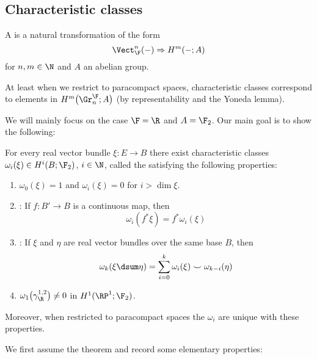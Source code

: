 \subsection{Characteristic classes}
\begin{definition}
	A  is a natural transformation of the form
	\begin{equation*}
		\Vect_{\F}^n({{-}}) \Rightarrow H^m({{-}}; A)
	\end{equation*}
	for $n, m \in \N$ and $A$ an abelian group.
\end{definition}
\begin{remark}
	At least when we restrict to paracompact spaces, characteristic classes correspond to elements in $H^m\big(\Gr^{\F}_n; A\big)$ (by representability and the Yoneda lemma).
\end{remark}
We will mainly focus on the case $\F = \R$ and $A = \F_2$.
Our main goal is to show the following:
\begin{theorem}\label{thm:existenceofswclasses}
	For every real vector bundle $\xi\colon E \to B$ there exist characteristic classes $\omega_i(\xi) \in H^i(B; \F_2)$, $i \in \N$, called the  satisfying the following properties:
	\begin{enumerate}
		\item\label{ax:stiefwhittriviality} $\omega_0(\xi) = 1$ and $\omega_i(\xi) = 0$ for $i > \dim \xi$.
		\item {}:
			If $f\colon B' \to B$ is a continuous map, then
			\begin{equation*}
				\omega_i(f^* \xi) = f^* \omega_i(\xi)
			\end{equation*}
		\item\label{ax:whitneyproduct} :
			If $\xi$ and $\eta$ are real vector bundles over the same base $B$, then
			\begin{equation*}
				\omega_k(\xi \dsum \eta) = \sum_{i = 0}^k \omega_i(\xi) \smile \omega_{k - i}(\eta)
			\end{equation*}
		\item\label{ax:stiefwhitnormalization} $\omega_1\big(\gamma_{\R}^{1, 2}\big) \neq 0$ in $H^1(\RP^1; \F_2)$.
	\end{enumerate}
	Moreover, when restricted to paracompact spaces the $\omega_i$ are unique with these properties.
\end{theorem}
We first assume the theorem and record some elementary properties:
